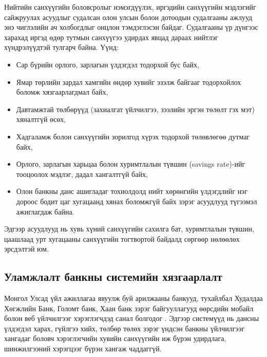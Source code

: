 Нийтийн санхүүгийн боловсролыг нэмэгдүүлэх, иргэдийн санхүүгийн мэдлэгийг сайжруулах асуудлыг судалсан олон улсын болон дотоодын судалгааны ажлууд \cite{mn_finlit, mn_personalfin} энэ чиглэлийн ач холбогдлыг онцлон тэмдэглэсэн байдаг. Судалгааны үр дүнгээс харахад иргэд өдөр тутмын санхүүгээ удирдах явцад дараах нийтлэг хүндрэлүүдтэй тулгарч байна. Үүнд:
\begin{itemize}
    \item [•] Сар бүрийн орлого, зарлагын үлдэгдэл тодорхой бус байх,
    \item [•] Ямар төрлийн зардал хамгийн өндөр хувийг эзэлж байгааг тодорхойлох боломж хязгаарлагдмал байх,
    \item [•] Давтамжтай төлбөрүүд (захиалгат үйлчилгээ, зээлийн эргэн төлөлт гэх мэт) хяналтгүй өсөх,
    \item [•] Хадгаламж болон санхүүгийн зорилгод хүрэх тодорхой төлөвлөгөө дутмаг байх,
    \item [•] Орлого, зарлагын харьцаа болон хуримтлалын түвшин (savings rate)-ийг тооцоолох мэдлэг, дадал хангалтгүй байх,
    \item [•] Олон банкны данс ашигладаг тохиолдолд нийт хөрөнгийн үлдэгдлийг нэг дороос бодит цаг хугацаанд хянах боломжгүй байх зэрэг асуудлууд түгээмэл ажиглагдаж байна.
\end{itemize}

Эдгээр асуудлууд нь хувь хүний санхүүгийн сахилга бат, хуримтлалын түвшин, цаашлаад урт хугацааны санхүүгийн тогтвортой байдалд сөргөөр нөлөөлөх эрсдэлтэй юм.

\subsection{Уламжлалт банкны системийн хязгаарлалт}
Монгол Улсад үйл ажиллагаа явуулж буй арилжааны банкууд, тухайлбал Худалдаа Хөгжлийн Банк, Голомт банк, Хаан банк зэрэг байгууллагууд өөрсдийн мобайл болон веб үйлчилгээг хэрэглэгчдэд санал болгодог \cite{mn_bankstat, mn_monbank}. Эдгээр системүүд нь дансны үлдэгдэл харах, гүйлгээ хийх, төлбөр төлөх зэрэг үндсэн банкны үйлчилгээг хангадаг боловч хэрэглэгчийн хувийн санхүүгийн иж бүрэн удирдлага, шинжилгээний хэрэгцээг бүрэн хангаж чаддаггүй.\\

